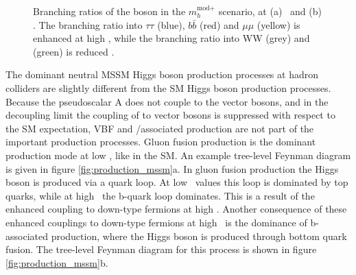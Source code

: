 \begin{figure}[h!]
\begin{center}
\end{center}
\caption{Branching ratios of the \PHiggs boson in the $m_{h}^{\text{mod+}}$ scenario,
at (a) ~and (b) . The branching ratio into $\tau\tau$ (blue), $b\bar{b}$ (red) 
and $\mu\mu$ (yellow) is enhanced at high \tanb, while the branching ratio into 
WW (grey) and \ttbar (green) is reduced \cite{MSSM-xswg-twiki}.}
\label{fig:mssm_brtautau}
\end{figure}

The dominant neutral MSSM Higgs boson production processes at hadron colliders
are slightly different from the \ac{SM} Higgs boson production processes. 
Because the pseudoscalar A does not couple to the
vector bosons, and in the decoupling limit the coupling of \PHiggs to vector
bosons is suppressed with respect to the \ac{SM} expectation, VBF and \PW/\PZ associated
production are not part of the important production processes. Gluon fusion production is 
the dominant production mode at low \tanb, like in the \ac{SM}. 
An example tree-level Feynman diagram is given in figure \ref{fig:production_mssm}a. In gluon fusion production the Higgs boson
is produced via a quark loop. At low \tanb~values this loop is dominated by top quarks, while at 
high \tanb~the b-quark loop dominates. This is a result of the enhanced coupling to down-type fermions at high \tanb. 
Another consequence of these enhanced couplings to down-type fermions at high \tanb~is the dominance of b-associated production, where the Higgs boson is produced through
bottom quark fusion. The tree-level Feynman diagram for this process is shown in figure \ref{fig:production_mssm}b.

